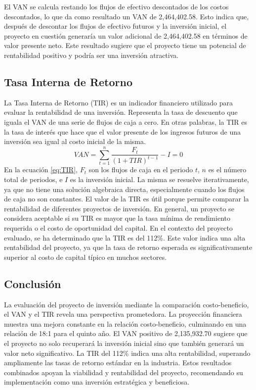 El VAN se calcula restando los flujos de efectivo descontados de los costos descontados, lo que da como resultado un VAN de 2,464,402.58. Esto indica que, después de descontar los flujos de efectivo futuros y la inversión inicial, el proyecto en cuestión generaría un valor adicional de 2,464,402.58 en términos de valor presente neto. Este resultado sugiere que el proyecto tiene un potencial de rentabilidad positivo y podría ser una inversión atractiva.

\subsection{Tasa Interna de Retorno}
La Tasa Interna de Retorno (TIR) es un indicador financiero utilizado para evaluar la rentabilidad de una inversión. Representa la tasa de descuento que iguala el VAN de una serie de flujos de caja a cero. En otras palabras, la TIR es la tasa de interés que hace que el valor presente de los ingresos futuros de una inversión sea igual al costo inicial de la misma.
\begin{equation}
    \label{eq:TIR}
    VAN = \sum_{t=1}^{n} \frac{F_t}{(1+TIR)^{t-1}} - I = 0
\end{equation}
\indent
En la ecuación \ref{eq:TIR}, $F_t$ son los flujos de caja en el periodo $t$, $n$ es el número total de periodos, e $I$ es la inversión inicial. La misma se resuelve iterativamente, ya que no tiene una solución algebraica directa, especialmente cuando los flujos de caja no son constantes. El valor de la TIR es útil porque permite comparar la rentabilidad de diferentes proyectos de inversión. En general, un proyecto se considera aceptable si su TIR es mayor que la tasa mínima de rendimiento requerida o el costo de oportunidad del capital. En el contexto del proyecto evaluado, se ha determinado que la TIR es del 112\%. Este valor indica una alta rentabilidad del proyecto, ya que la tasa de retorno esperada es significativamente superior al costo de capital típico en muchos sectores.

\subsection{Conclusión}
La evaluación del proyecto de inversión mediante la comparación costo-beneficio, el VAN y el TIR revela una perspectiva prometedora. La proyección financiera muestra una mejora constante en la relación costo-beneficio, culminando en una relación de 18:1 para el quinto año. El VAN positivo de 2,135,932.70 sugiere que el proyecto no solo recuperará la inversión inicial sino que también generará un valor neto significativo. La TIR del 112\% indica una alta rentabilidad, superando ampliamente las tasas de retorno estándar en la industria. Estos resultados combinados apoyan la viabilidad y rentabilidad del proyecto, recomendando su implementación como una inversión estratégica y beneficiosa.

